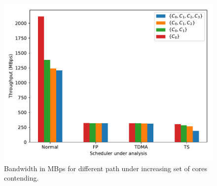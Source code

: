 \begin{figure}
  \centering
  \includegraphics[scale=0.45]{images/bw_comparisons.pdf}
  \caption{Bandwidth in MBps for different path under increasing set of cores contending.}
  \label{fig:bandwidth_comparison}
\end{figure}

